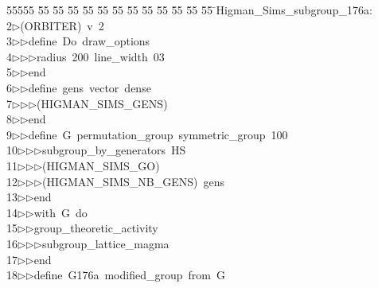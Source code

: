 %
%
\begin{tabbing}
55555 \= 55 \= 55 \= 55 \= 55 \= 55 \= 55 \= 55 \= 55 \= 55 \= 55 \= 55 \= 55 \= \>Higman\_Sims\_subgroup\_176a:\\[0pt]
2\>$\triangleright$\>(ORBITER)\ v\ 2\ \\[0pt]
3\>$\triangleright$\>$\triangleright$\>define\ Do\ draw\_options\ \\[0pt]
4\>$\triangleright$\>$\triangleright$\>$\triangleright$\>radius\ 200\ line\_width\ 03\ \\[0pt]
5\>$\triangleright$\>$\triangleright$\>end\ \\[0pt]
6\>$\triangleright$\>$\triangleright$\>define\ gens\ vector\ dense\ \\[0pt]
7\>$\triangleright$\>$\triangleright$\>$\triangleright$\>(HIGMAN\_SIMS\_GENS)\ \\[0pt]
8\>$\triangleright$\>$\triangleright$\>end\ \\[0pt]
9\>$\triangleright$\>$\triangleright$\>define\ G\ permutation\_group\ symmetric\_group\ 100\ \\[0pt]
10\>$\triangleright$\>$\triangleright$\>$\triangleright$\>subgroup\_by\_generators\ HS\ \\[0pt]
11\>$\triangleright$\>$\triangleright$\>$\triangleright$\>(HIGMAN\_SIMS\_GO)\ \\[0pt]
12\>$\triangleright$\>$\triangleright$\>$\triangleright$\>(HIGMAN\_SIMS\_NB\_GENS)\ gens\ \\[0pt]
13\>$\triangleright$\>$\triangleright$\>end\ \\[0pt]
14\>$\triangleright$\>$\triangleright$\>with\ G\ do\ \\[0pt]
15\>$\triangleright$\>$\triangleright$\>group\_theoretic\_activity\ \\[0pt]
16\>$\triangleright$\>$\triangleright$\>$\triangleright$\>subgroup\_lattice\_magma\ \\[0pt]
17\>$\triangleright$\>$\triangleright$\>end\ \\[0pt]
18\>$\triangleright$\>$\triangleright$\>define\ G176a\ modified\_group\ from\ G\ \\[0pt]

\end{tabbing}
